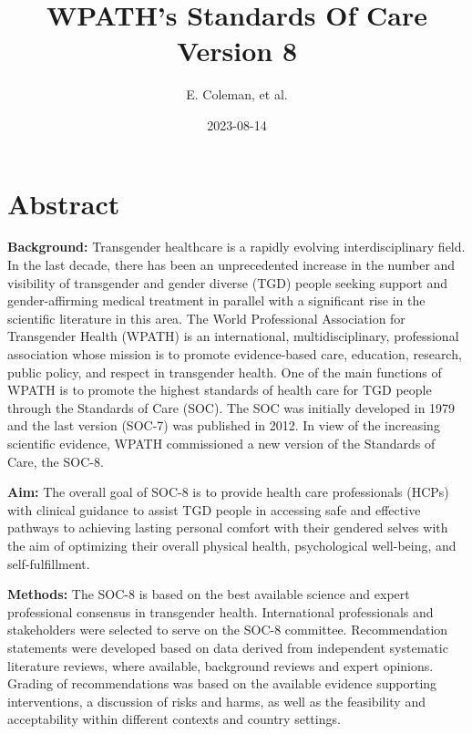 \documentclass[
]{book}
\title{WPATH's Standards Of Care Version 8}
\author{E. Coleman, et al.}
\date{2023-08-14}
\begin{document}
\maketitle

{
\setcounter{tocdepth}{1}
\tableofcontents
}
\hypertarget{abstract}{%
\chapter*{Abstract}\label{abstract}}

\textbf{Background:} Transgender healthcare is a rapidly evolving interdisciplinary field. In the last
decade, there has been an unprecedented increase in the number and visibility of transgender
and gender diverse (TGD) people seeking support and gender-affirming medical treatment
in parallel with a significant rise in the scientific literature in this area. The World Professional
Association for Transgender Health (WPATH) is an international, multidisciplinary, professional
association whose mission is to promote evidence-based care, education, research, public
policy, and respect in transgender health. One of the main functions of WPATH is to promote
the highest standards of health care for TGD people through the Standards of Care (SOC).
The SOC was initially developed in 1979 and the last version (SOC-7) was published in 2012.
In view of the increasing scientific evidence, WPATH commissioned a new version of the
Standards of Care, the SOC-8.

\textbf{Aim:} The overall goal of SOC-8 is to provide health care professionals (HCPs) with clinical
guidance to assist TGD people in accessing safe and effective pathways to achieving lasting
personal comfort with their gendered selves with the aim of optimizing their overall physical
health, psychological well-being, and self-fulfillment.

\textbf{Methods:} The SOC-8 is based on the best available science and expert professional consensus
in transgender health. International professionals and stakeholders were selected to serve
on the SOC-8 committee. Recommendation statements were developed based on data
derived from independent systematic literature reviews, where available, background reviews
and expert opinions. Grading of recommendations was based on the available evidence
supporting interventions, a discussion of risks and harms, as well as the feasibility and
acceptability within different contexts and country settings.
\end{document}

